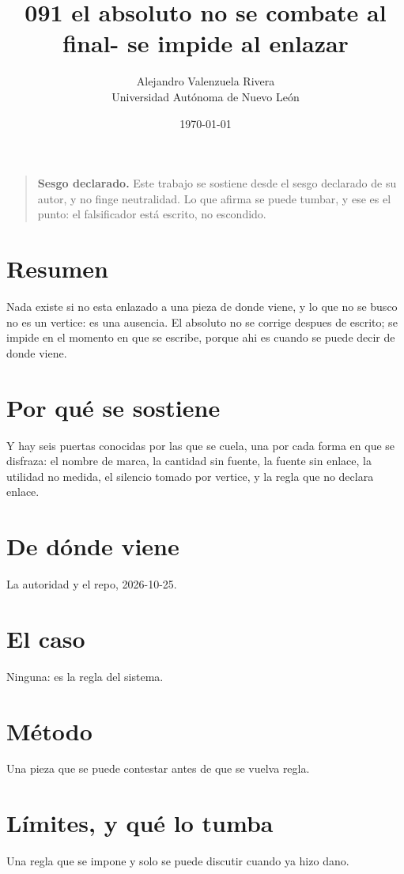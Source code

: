 \documentclass[11pt,a4paper]{article}
\title{091 el absoluto no se combate al final- se impide al enlazar}
\author{Alejandro Valenzuela Rivera\\\small Universidad Autónoma de Nuevo León}
\date{\today}
\begin{document}
\maketitle

\begin{quote}
\textbf{Sesgo declarado.} Este trabajo se sostiene desde el sesgo declarado de su autor, y no finge neutralidad. Lo que afirma se puede tumbar, y ese es el punto: el falsificador está escrito, no escondido.
\end{quote}

\section*{Resumen}
Nada existe si no esta enlazado a una pieza de donde viene, y lo que no se busco no es un vertice: es una ausencia. El absoluto no se corrige despues de escrito; se impide en el momento en que se escribe, porque ahi es cuando se puede decir de donde viene.

\section{Por qué se sostiene}
Y hay seis puertas conocidas por las que se cuela, una por cada forma en que se disfraza: el nombre de marca, la cantidad sin fuente, la fuente sin enlace, la utilidad no medida, el silencio tomado por vertice, y la regla que no declara enlace.

\section{De dónde viene}
La autoridad y el repo, 2026-10-25.

\section{El caso}
Ninguna: es la regla del sistema.

\section{Método}
Una pieza que se puede contestar antes de que se vuelva regla.

\section{Límites, y qué lo tumba}
Una regla que se impone y solo se puede discutir cuando ya hizo dano.
\end{document}
